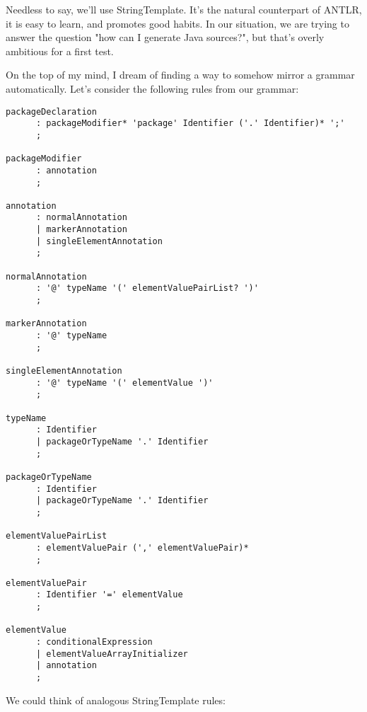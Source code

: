 \documentclass[11pt]{article}
\begin{document}
Needless to say, we'll use StringTemplate. It's the natural counterpart of ANTLR, it is easy to learn, and promotes good habits.
In our situation, we are trying to answer the question "how can I generate Java sources?", but that's overly ambitious for a
first test.

On the top of my mind, I dream of finding a way to somehow mirror a grammar automatically. Let's consider the following rules from our grammar:

\begin{verbatim}
packageDeclaration
      :	packageModifier* 'package' Identifier ('.' Identifier)* ';'
      ;

packageModifier
      :	annotation
      ;

annotation
      :	normalAnnotation
      |	markerAnnotation
      |	singleElementAnnotation
      ;

normalAnnotation
      :	'@' typeName '(' elementValuePairList? ')'
      ;

markerAnnotation
      :	'@' typeName
      ;

singleElementAnnotation
      :	'@' typeName '(' elementValue ')'
      ;

typeName
      :	Identifier
      |	packageOrTypeName '.' Identifier
      ;

packageOrTypeName
      :	Identifier
      |	packageOrTypeName '.' Identifier
      ;

elementValuePairList
      :	elementValuePair (',' elementValuePair)*
      ;

elementValuePair
      :	Identifier '=' elementValue
      ;

elementValue
      :	conditionalExpression
      |	elementValueArrayInitializer
      |	annotation
      ;
\end{verbatim}

We could think of analogous StringTemplate rules:
\end{document}
